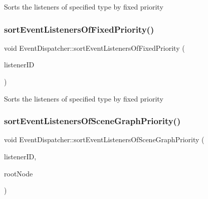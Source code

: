 Sorts the listeners of specified type by fixed priority \mbox{\label{classEventDispatcher_a83e6fcd45dbc28743b3dc015a3061ef2}} 
\subsubsection{\texorpdfstring{sort\+Event\+Listeners\+Of\+Fixed\+Priority()}{sortEventListenersOfFixedPriority()}\hspace{0.1cm}{\footnotesize\ttfamily [2/2]}}
{\footnotesize\ttfamily void Event\+Dispatcher\+::sort\+Event\+Listeners\+Of\+Fixed\+Priority (\begin{DoxyParamCaption}\item[{const Event\+Listener\+::\+Listener\+ID \&}]{listener\+ID }\end{DoxyParamCaption})\hspace{0.3cm}{\ttfamily [protected]}}

Sorts the listeners of specified type by fixed priority \mbox{\label{classEventDispatcher_a6afb74a0ae37c6653e50f5cddfaa0dd2}} 
\subsubsection{\texorpdfstring{sort\+Event\+Listeners\+Of\+Scene\+Graph\+Priority()}{sortEventListenersOfSceneGraphPriority()}\hspace{0.1cm}{\footnotesize\ttfamily [1/2]}}
{\footnotesize\ttfamily void Event\+Dispatcher\+::sort\+Event\+Listeners\+Of\+Scene\+Graph\+Priority (\begin{DoxyParamCaption}\item[{const Event\+Listener\+::\+Listener\+ID \&}]{listener\+ID,  }\item[{\hyperlink{classNode}{Node} $\ast$}]{root\+Node }\end{DoxyParamCaption})\hspace{0.3cm}{\ttfamily [protected]}}

